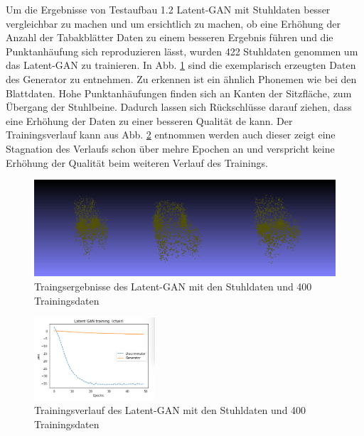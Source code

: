 \documentclass{llncs}
\begin{document}
\pagebreak\linebreak 
Um die Ergebnisse von Testaufbau 1.2 Latent-GAN mit Stuhldaten besser vergleichbar zu machen und um ersichtlich zu machen, ob eine Erhöhung der Anzahl der Tabakblätter Daten zu einem besseren Ergebnis führen  und die Punktanhäufung sich reproduzieren lässt, wurden 422 Stuhldaten genommen um das Latent-GAN zu trainieren. In Abb. \ref{fig:Bild66} sind die exemplarisch erzeugten Daten des Generator zu entnehmen. Zu erkennen ist ein ähnlich Phonemen wie bei den Blattdaten. Hohe Punktanhäufungen finden sich an Kanten der Sitzfläche, zum Übergang der Stuhlbeine. Dadurch lassen sich Rückschlüsse darauf ziehen, dass eine Erhöhung der Daten zu einer besseren Qualität de kann. Der Trainingsverlauf kann aus Abb. \ref{fig:Bild65} entnommen werden auch dieser zeigt eine Stagnation des Verlaufs schon über mehre Epochen an und verspricht keine Erhöhung der Qualität beim weiteren Verlauf des Trainings.
\begin{figure}[htbp] 
	\centering
	\includegraphics[width=1.0\textwidth]{raw_gan_latent_gan_chair_example_400.png}
	\caption{Traingsergebnisse des Latent-GAN mit den Stuhldaten und 400 Trainingsdaten}
	\label{fig:Bild66}
\end{figure}
\begin{figure}[htbp] 
	\centering
	\includegraphics[width=0.4\textwidth]{raw_gan_latent_gan_chair_result_400_example.png}
	\caption{Trainingsverlauf des Latent-GAN mit den Stuhldaten und 400 Trainingsdaten}
	\label{fig:Bild65}
\end{figure}
\pagebreak\linebreak
\end{document}
